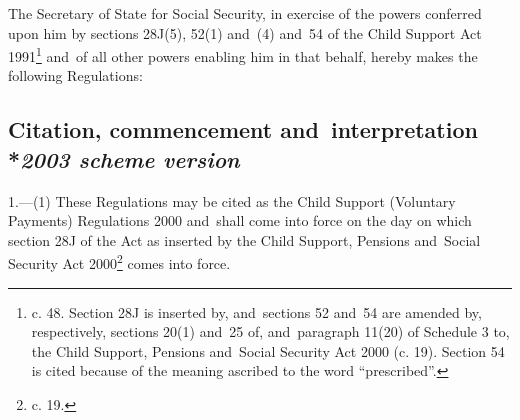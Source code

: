 \documentclass[12pt,a4paper]{article}
\title{\regstitle}
\author{S.I. 2000 No. 3177}
\date{Made 30th November 2000\\Laid before Parliament 6th December 2000\\Coming into force as provided in regulation~1(1)}
\begin{document}
\maketitle


\medskip

\noindent
The Secretary of State for Social Security, in exercise of the powers conferred upon him by sections 28J(5), 52(1) and~(4) and~54 of the Child Support Act 1991\footnote{ c. 48. Section 28J is inserted by, and~sections 52 and~54 are amended by, respectively, sections 20(1) and~25 of, and~paragraph 11(20) of Schedule 3 to, the Child Support, Pensions and~Social Security Act 2000 (c. 19). Section 54 is cited because of the meaning ascribed to the word “prescribed”.} and~of all other powers enabling him in that behalf, hereby makes the following Regulations: 

{\sloppy

\tableofcontents

}

\bigskip

\setcounter{secnumdepth}{-2}

\subsection[1. Citation, commencement and~interpretation --- \emph{2003 scheme version}]{Citation, commencement and~interpretation\\*\emph{2003 scheme version}}

1.---(1)  These Regulations may be cited as the Child Support (Voluntary Payments) Regulations 2000 and~shall come into force on the day on which section 28J of the Act as inserted by the Child Support, Pensions and~Social Security Act 2000\footnote{ c. 19.} comes into force.
\end{document}
